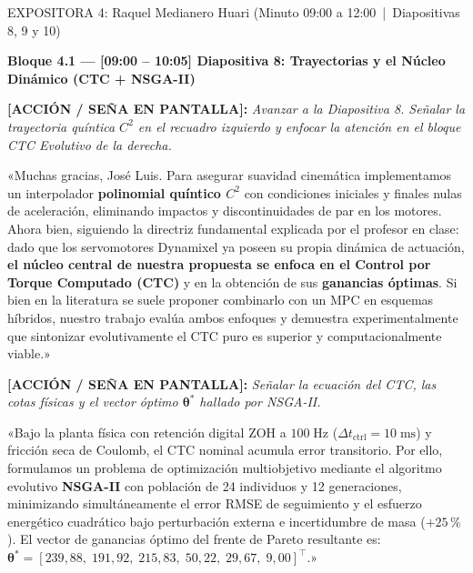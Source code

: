 \documentclass[11pt,a4paper]{article}
\newcommand{\accion}[1]{%
  \par\smallskip\noindent%
  {\color{uniGranate}\textbf{[ACCIÓN / SEÑA EN PANTALLA]:}} {\itshape\color{uniAzul!90!black} #1}\par\smallskip%
}
\newcommand{\speech}[1]{%
  \noindent{\color{verdeOk!85!black}\textbf{[SPEECH]:}} «#1»\par\medskip%
}
\begin{document}
\begin{cajaexpositor}[verdeOk]{EXPOSITORA 4: Raquel Medianero Huari (Minuto 09:00 a 12:00 \,|\, Diapositivas 8, 9 y 10)}

\textbf{\color{verdeOk}Bloque 4.1 --- [09:00 -- 10:05] Diapositiva 8: Trayectorias y el Núcleo Dinámico (CTC + NSGA-II)}
\accion{Avanzar a la Diapositiva 8. Señalar la trayectoria quíntica $C^2$ en el recuadro izquierdo y enfocar la atención en el bloque CTC Evolutivo de la derecha.}
\speech{Muchas gracias, José Luis. Para asegurar suavidad cinemática implementamos un interpolador \textbf{polinomial quíntico $C^2$} con condiciones iniciales y finales nulas de aceleración, eliminando impactos y discontinuidades de par en los motores. Ahora bien, siguiendo la directriz fundamental explicada por el profesor en clase: dado que los servomotores Dynamixel ya poseen su propia dinámica de actuación, \textbf{el núcleo central de nuestra propuesta se enfoca en el Control por Torque Computado (CTC)} y en la obtención de sus \textbf{ganancias óptimas}. Si bien en la literatura se suele proponer combinarlo con un MPC en esquemas híbridos, nuestro trabajo evalúa ambos enfoques y demuestra experimentalmente que sintonizar evolutivamente el CTC puro es superior y computacionalmente viable.}

\accion{Señalar la ecuación del CTC, las cotas físicas y el vector óptimo $\bm{\theta}^*$ hallado por NSGA-II.}
\speech{Bajo la planta física con retención digital ZOH a $100\;\text{Hz}$ ($\Delta t_{\text{ctrl}} = 10\;\text{ms}$) y fricción seca de Coulomb, el CTC nominal acumula error transitorio. Por ello, formulamos un problema de optimización multiobjetivo mediante el algoritmo evolutivo \textbf{NSGA-II} con población de 24 individuos y 12 generaciones, minimizando simultáneamente el error RMSE de seguimiento y el esfuerzo energético cuadrático bajo perturbación externa e incertidumbre de masa ($+25\,\%$). El vector de ganancias óptimo del frente de Pareto resultante es: $\bm{\theta}^* = [239{,}88,\; 191{,}92,\; 215{,}83,\; 50{,}22,\; 29{,}67,\; 9{,}00]^\top$.}


\end{cajaexpositor}
\end{document}
